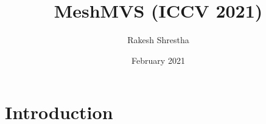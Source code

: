 \documentclass{article}
\title{MeshMVS (ICCV 2021)}
\author{Rakesh Shrestha}
\date{February 2021}
\begin{document}
\maketitle

\section{Introduction}
\end{document}
